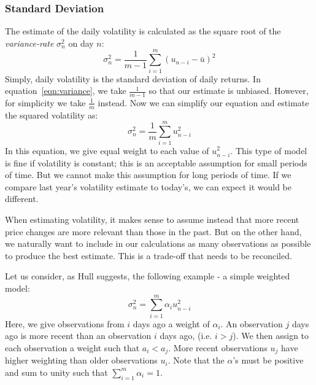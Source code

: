 \documentclass[../background_research.tex]{subfiles}
\begin{document}
\subsubsection{Standard Deviation}

The estimate of the daily volatility is calculated as the square root of the \textit{variance-rate} $\sigma^2_{n}$ on day $n$:
\begin{equation}
    \label{eqn:variance}
    \sigma^2_{n} = \frac{1}{m-1}\sum_{i=1}^m{(u_{n-i}-\bar{u})^2}
\end{equation}
Simply, daily volatility is the standard deviation of daily returns.
In equation~\ref{eqn:variance}, we take $\frac{1}{m-1}$ so that our estimate is unbiased.
However, for simplicity we take $\frac{1}{m}$ instead.
Now we can simplify our equation and estimate the squared volatility as:
\begin{equation}
    \label{eqn:varianceSimplified}
    \sigma^2_n={\frac{1}{m}}\sum_{i=1}^mu^2_{n-i}
\end{equation}
In this equation, we give equal weight to each value of $u^2_{n-i}$.
This type of model is fine if volatility is constant; this is an acceptable assumption for small periods of time.
But we cannot make this assumption for long periods of time.
If we compare last year's volatility estimate to today's, we can expect it would be different.

When estimating volatility, it makes sense to assume instead that more recent price changes are more relevant than those in the past.
But on the other hand, we naturally want to include in our calculations as many observations as possible to produce the best estimate.
This is a trade-off that needs to be reconciled.

Let us consider, as Hull suggests, the following example - a simple weighted model:
\begin{equation}
    \label{eqn:weightedmodel}
    \sigma^2 _n = \sum_{i=1}^m{\alpha_i}u^2_{n-i}
\end{equation}
Here, we give observations from $i$ days ago a weight of $\alpha_i$.
An observation $j$ days ago is more recent than an observation $i$ days ago, (i.e. $i > j$).
We then assign to each observation a weight such that $a_i < a_j$.
More recent observations $u_j$ have higher weighting than older observations $u_i$.
Note that the $\alpha$'s must be positive and sum to unity such that $\sum_{i=1}^m{\alpha_i} = 1$.
\end{document}
